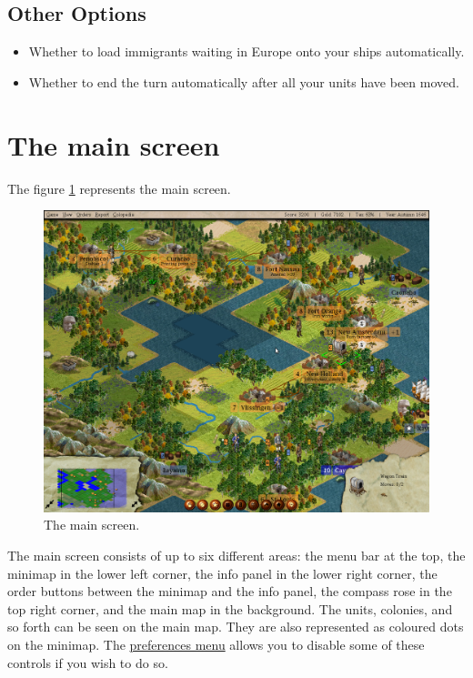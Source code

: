 \documentclass[12pt]{book}
\begin{document}
\hypertarget{other options}{\subsection{Other Options}}

\begin{itemize}
\item Whether to load immigrants waiting in Europe onto your ships
  automatically.
\item Whether to end the turn automatically after all your units have
  been moved.
\end{itemize}


\hypertarget{main screen}{\section{The main screen}}

The figure \ref{main_screen_fig} represents the main screen.
\begin{figure}[htb]
  \begin{center}
    \includegraphics[scale=0.35]{images/main_screen.png}
    \caption{The main screen.\label{main_screen_fig}}
  \end{center}
\end{figure}

The main screen consists of up to six different areas: the menu bar at
the top, the minimap in the lower left corner, the info panel in the
lower right corner, the order buttons between the minimap and the info
panel, the compass rose in the top right corner, and the main map in
the background. The units, colonies, and so forth can be seen on the
main map. They are also represented as coloured dots on the minimap.
The \hyperlink{client options}{preferences menu} allows you to disable
some of these controls if you wish to do so.
\end{document}
